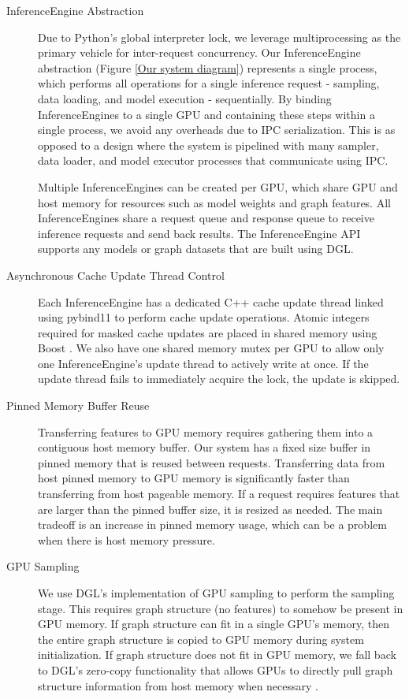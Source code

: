 \begin{description}
    \item[InferenceEngine Abstraction] Due to Python's global interpreter lock, we leverage multiprocessing as the primary vehicle for inter-request concurrency. Our InferenceEngine abstraction (Figure \ref{Our system diagram}) represents a single process, which performs all operations for a single inference request - sampling, data loading, and model execution - sequentially. By binding InferenceEngines to a single GPU and containing these steps within a single process, we avoid any overheads due to IPC serialization. This is as opposed to a design where the system is pipelined with many sampler, data loader, and model executor processes that communicate using IPC. 

    Multiple InferenceEngines can be created per GPU, which share GPU and host memory for resources such as model weights and graph features. All InferenceEngines share a request queue and response queue to receive inference requests and send back results. The InferenceEngine API supports any models or graph datasets that are built using DGL.

    \item[Asynchronous Cache Update Thread Control] Each InferenceEngine has a dedicated C++ cache update thread linked using pybind11 \cite{pybind11} to perform cache update operations. Atomic integers required for masked cache updates are placed in shared memory using Boost \cite{BoostLibrary}. We also have one shared memory mutex per GPU to allow only one InferenceEngine's update thread to actively write at once. If the update thread fails to immediately acquire the lock, the update is skipped.

    \item[Pinned Memory Buffer Reuse] Transferring features to GPU memory requires gathering them into a contiguous host memory buffer. Our system has a fixed size buffer in pinned memory that is reused between requests. Transferring data from host pinned memory to GPU memory is significantly faster than transferring from host pageable memory. If a request requires features that are larger than the pinned buffer size, it is resized as needed. The main tradeoff is an increase in pinned memory usage, which can be a problem when there is host memory pressure.

    \item[GPU Sampling] We use DGL's implementation of GPU sampling to perform the sampling stage. This requires graph structure (no features) to somehow be present in GPU memory. If graph structure can fit in a single GPU's memory, then the entire graph structure is copied to GPU memory during system initialization. If graph structure does not fit in GPU memory, we fall back to DGL's zero-copy functionality that allows GPUs to directly pull graph structure information from host memory when necessary \cite{PyTorch_Direct_2021}. 


\end{description}

